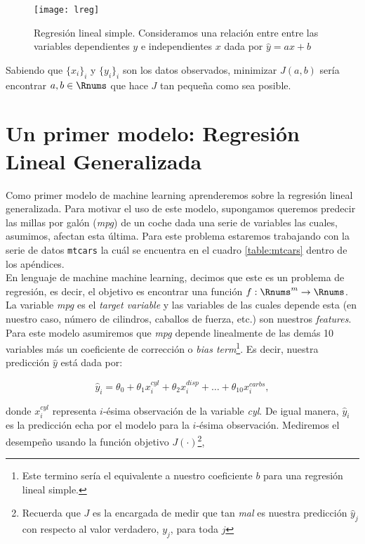 \documentclass[11pt]{article}
\begin{document}
\begin{figure}[h!]
	\centering
	\texttt{[image: lreg]}
\caption{Regresión lineal simple. Consideramos una relación entre entre las variables dependientes $y$ e independientes $x$ dada por $\hat y = ax + b$}
\label{fig:simple_lreg}
\end{figure}

Sabiendo que $\{x_i\}_i$ y $\{y_i\}_i$ son los datos observados, minimizar $J(a, b)$ sería encontrar $a, b \in \Rnums$ que hace $J$ tan pequeña como sea posible.

\section{Un primer modelo: Regresión Lineal Generalizada}
Como primer modelo de machine learning aprenderemos sobre la regresión lineal generalizada. Para motivar el uso de este modelo, supongamos queremos predecir las millas por galón (\textit{mpg}) de un coche dada una serie de variables las cuales, asumimos, afectan esta última. Para este problema estaremos trabajando con la serie de datos \texttt{mtcars} la cuál se encuentra en el cuadro \ref{table:mtcars} dentro de los apéndices.\\

En lenguaje de machine machine learning, decimos que este es un problema de regresión, es decir, el objetivo es encontrar una función $f:\Rnums^m \to \Rnums$. La variable \textit{mpg} es el \textit{target variable} y las variables de las cuales depende esta (en nuestro caso, número de cilindros, caballos de fuerza, etc.) son nuestros \textit{features}.\\

Para este modelo asumiremos que \textit{mpg} depende linealmente de las demás 10 variables más un coeficiente de corrección o \textit{bias term}\footnote{Este termino sería el equivalente a nuestro coeficiente $b$ para una regresión lineal simple.}. Es decir, nuestra predicción $\hat y$ está dada por:

\begin{equation}
	\hat y_i = \theta_0 + \theta_1x^{cyl}_i + \theta_2x^{disp}_i + \ldots + \theta_{10}x^{carbs}_i,
\end{equation}

donde $x_i^{cyl}$ representa $i$-ésima observación de la variable \textit{cyl}. De igual manera, $\hat y_i$ es la predicción echa por el modelo para la $i$-ésima observación. Mediremos el desempeño usando la función objetivo $J(\cdot)$\footnote{Recuerda que $J$ es la encargada de medir que tan \textit{mal} es nuestra predicción $\hat y_j$ con respecto al valor verdadero, $y_j$, para toda $j$},
\end{document}
